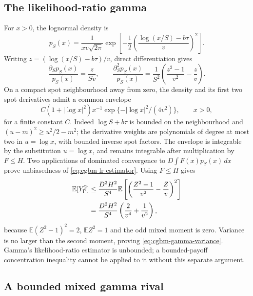 \documentclass[11pt]{article}
\begin{document}
\subsection{The likelihood-ratio gamma}

For $x>0$, the lognormal density is
\begin{equation}
 p_S(x)=\frac{1}{xv\sqrt{2\pi}}
 \exp\!\left[-\frac{1}{2}
 \left(\frac{\log(x/S)-b\tau}{v}\right)^2\right].
 \label{eq:cgbm-density}
\end{equation}
Writing $z=(\log(x/S)-b\tau)/v$, direct differentiation gives
\begin{equation}
 \frac{\partial_Sp_S(x)}{p_S(x)}=\frac{z}{Sv},\qquad
 \frac{\partial_S^2p_S(x)}{p_S(x)}
 =\frac{1}{S^2}\left(\frac{z^2-1}{v^2}-\frac{z}{v}\right).
 \label{eq:cgbm-lr-weight}
\end{equation}
On a compact spot neighbourhood away from zero, the density and its first
two spot derivatives admit a common envelope
\begin{equation}
 C(1+|\log x|^2)x^{-1}
 \exp\{-|\log x|^2/(4v^2)\},\qquad x>0,
 \label{eq:cgbm-lr-envelope}
\end{equation}
for a finite constant $C$. Indeed $\log S+b\tau$ is bounded on the
neighbourhood and $(u-m)^2\geq u^2/2-m^2$; the derivative weights are
polynomials of degree at most two in $u=\log x$, with bounded inverse
spot factors. The envelope is integrable by the substitution $u=\log x$,
and remains integrable after multiplication by $F\leq H$.
Two applications of dominated convergence
to $D\int F(x)p_S(x)\,dx$ prove unbiasedness of
\eqref{eq:cgbm-lr-estimator}. Using $F\leq H$ gives
\begin{align}
 \mathbb E[Y_\Gamma^2]
 &\leq \frac{D^2H^2}{S^4}
 \mathbb E\left[
 \left(\frac{Z^2-1}{v^2}-\frac{Z}{v}\right)^2\right]\notag\\
 &=\frac{D^2H^2}{S^4}
 \left(\frac{2}{v^4}+\frac{1}{v^2}\right),
 \label{eq:cgbm-lr-moment}
\end{align}
because $\mathbb E(Z^2-1)^2=2$, $\mathbb E Z^2=1$ and the odd mixed
moment is zero. Variance is no larger than the second moment, proving
\eqref{eq:cgbm-gamma-variance}. Gamma's likelihood-ratio estimator is
unbounded; a bounded-payoff concentration inequality cannot be applied
to it without this separate argument.

\subsection{A bounded mixed gamma rival}
\end{document}
